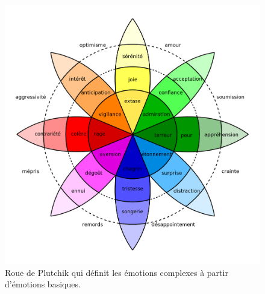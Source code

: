 \begin{figure}
  \centering
  \includegraphics[width=12cm]{./Chapitre1/figures/Plutchik.png}
  \caption{Roue de Plutchik qui définit les émotions complexes à partir d'émotions basiques.}
  \label{fig:Plutchik}
\end{figure}
